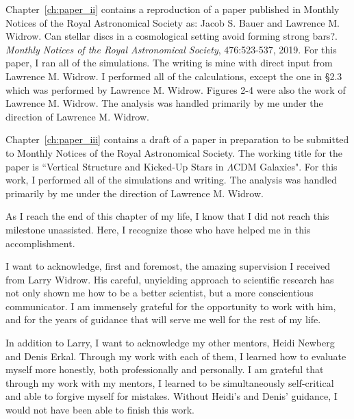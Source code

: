 Chapter~\ref{ch:paper_ii} contains a reproduction of a paper published in  Monthly Notices of the
Royal Astronomical Society as: Jacob S. Bauer and Lawrence M. Widrow. Can stellar discs in a cosmological setting avoid forming strong bars?. \textit{Monthly Notices of the Royal Astronomical Society}, 476:523-537,
2019. For this paper, I ran all of the simulations. The writing is mine with direct input from Lawrence M. Widrow. I performed all of the calculations, except the one in \S2.3 which was performed by Lawrence M. Widrow. Figures 2-4 were also the work of Lawrence M. Widrow. The analysis was handled primarily by me under the direction of Lawrence M. Widrow.

Chapter~\ref{ch:paper_iii} contains a draft of a paper in preparation to be submitted to Monthly Notices of the Royal Astronomical Society. The working title for the paper is ``Vertical Structure and Kicked-Up Stars in $\Lambda$CDM Galaxies". For this work, I performed all of the simulations and writing. The analysis was handled primarily by me under the direction of Lawrence M. Widrow.




As I reach the end of this chapter of my life, I know that I did not reach this milestone unassisted. Here, I recognize those who have helped me in this accomplishment.

I want to acknowledge, first and foremost, the amazing supervision I received from Larry Widrow. His careful, unyielding approach to scientific research has not only shown me how to be a better scientist, but a more conscientious communicator. I am immensely grateful for the opportunity to work with him, and for the years of guidance that will serve me well for the rest of my life.

In addition to Larry, I want to acknowledge my other mentors, Heidi Newberg and Denis Erkal. Through my work with each of them, I learned how to evaluate myself more honestly, both professionally and personally. I am grateful that through my work with my mentors, I learned to be simultaneously self-critical and able to forgive myself for mistakes. Without Heidi's and Denis' guidance, I would not have been able to finish this work.

